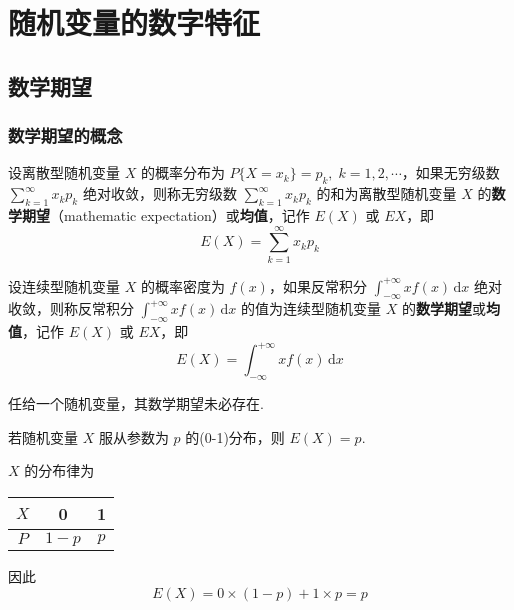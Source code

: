 
\chapter{随机变量的数字特征}

\section{数学期望}

\subsection{数学期望的概念}

\begin{definition}
    设离散型随机变量 $X$ 的概率分布为 $P\{X=x_k\} = p_k, \; k=1,2,\cdots$，如果无穷级数 $\displaystyle\sum_{k=1}^{\infty} x_k p_k$ 绝对收敛，则称无穷级数 $\displaystyle\sum_{k=1}^{\infty} x_k p_k$ 的和为离散型随机变量 $X$ 的\textbf{数学期望}（mathematic expectation）或\textbf{均值}，记作 $E(X)$ 或 $EX$，即
    $$
    E(X) = \sum_{k=1}^{\infty} x_k p_k
    $$

    设连续型随机变量 $X$ 的概率密度为 $f(x)$，如果反常积分 $\displaystyle\int_{-\infty}^{+\infty} x f(x) \, \text{d}x$ 绝对收敛，则称反常积分 $\displaystyle\int_{-\infty}^{+\infty} x f(x) \, \text{d}x$ 的值为连续型随机变量 $X$ 的\textbf{数学期望}或\textbf{均值}，记作 $E(X)$ 或 $EX$，即
    $$
    E(X) = \int_{-\infty}^{+\infty} x f(x) \, \text{d}x
    $$
\end{definition}

任给一个随机变量，其数学期望未必存在.

\begin{conclusion}
    若随机变量 $X$ 服从参数为 $p$ 的(0-1)分布，则 $E(X) = p$.
\end{conclusion}

\begin{myproof}
    $X$ 的分布律为

    \begin{center}
        \begin{tabular}{c | c c}
            \hline
            $X$ & 0 & 1 \\
            \hline
            $P$ & $1-p$ & $p$ \\
            \hline
        \end{tabular}
    \end{center}

    因此
    $$
    E(X) = 0 \times (1-p) + 1 \times p = p
    $$
\end{myproof}

